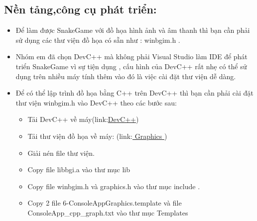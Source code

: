 \documentclass[13pt,a4paper]{article}
\begin{document}
\subsection{Nền tảng,công cụ phát triển:}
\begin{itemize}
    \item Để làm được SnakeGame với đồ họa hình ảnh và âm thanh thì bạn cần phải sử dụng các thư viện đồ họa có sẵn như : winbgim.h .
	\item Nhóm em đã chọn DevC++ mà không phải Visual Studio làm IDE để phát triển SnakeGame vì sự tiện dụng , cấu hình của DevC++ rất nhẹ có thể sử dụng trên nhiều máy tính thêm vào đó là việc cài đặt thư viện dễ dàng.
	\item Để có thể lập trình đồ họa bằng C++ trên DevC++ thì bạn cần phải cài đặt thư viện winbgim.h vào DevC++ theo các bước sau:
	\begin{itemize}
	    \item Tải DevC++ về máy(link:\href { https://sourceforge.net/projects/embarcadero-devcpp/?fbclid=IwAR28tY1k2jzEnAbQSJlN0Q3Jg741Yeg2CxNU95PquCyH-XCROjNtL2ZfUW8} {DevC++})
	\item Tải thư viện đồ họa về máy: 
(link:\href { https://drive.google.com/file/d/1iA5XMpK5XhypoUQ5ff2jejrrzEIvomM2/view?usp=sharing} { Graphics })
\item Giải nén file thư viện.
\item Copy file libbgi.a vào thư mục lib 
\item Copy file winbgim.h và graphics.h vào thư mục include .
\item Copy 2 file 6-ConsoleAppGraphics.template và file\\ ConsoleApp\_cpp\_graph.txt vào thư mục Templates  
	\end{itemize}
\end{itemize}
\end{document}
